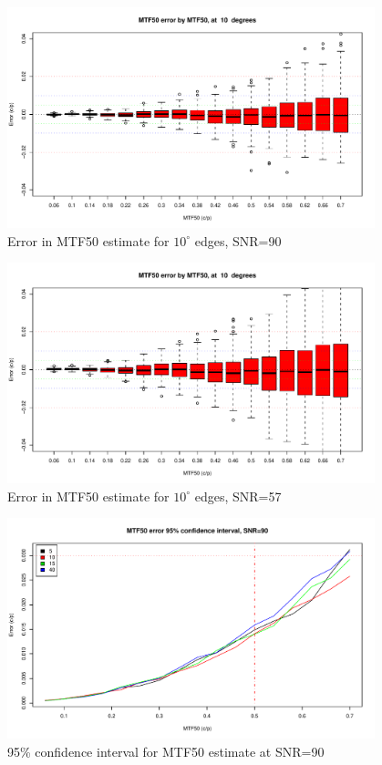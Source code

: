 \documentclass[a4paper]{article}
\begin{document}
\begin{figure}
\centering
\includegraphics[width=0.95\textwidth]{figures/accuracy_plot_a10_90}
\caption{Error in MTF50 estimate for $10^\circ$ edges, SNR=90}
\label{fig:mtf_accuracy_a10_snr90}
\end{figure}

\begin{figure}
\centering
\includegraphics[width=0.95\textwidth]{figures/accuracy_plot_a10_57}
\caption{Error in MTF50 estimate for $10^\circ$ edges, SNR=57}
\label{fig:mtf_accuracy_a10_snr57}
\end{figure}

\begin{figure}
\centering
\includegraphics[width=0.95\textwidth]{figures/accuracy_plot_90}
\caption{95\% confidence interval for MTF50 estimate at SNR=90}
\label{fig:mtf_accuracy_snr90}
\end{figure}
\end{document}
